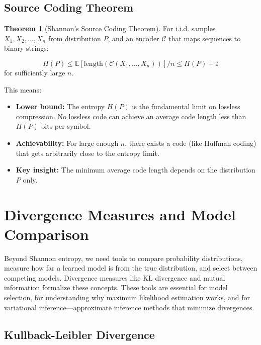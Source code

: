 \documentclass[12pt,a4paper]{article}
\theoremstyle{definition}
\newtheorem{theorem}{Theorem}[section]
\begin{document}
\subsection{Source Coding Theorem}

\begin{theorem}[Shannon's Source Coding Theorem]
For i.i.d. samples $X_1, X_2, \ldots, X_n$ from distribution $P$, and an encoder $\mathcal{C}$ that maps sequences to binary strings:

\[
H(P) \leq \mathbb{E}[\text{length}(\mathcal{C}(X_1, \ldots, X_n))] / n \leq H(P) + \varepsilon
\]
for sufficiently large $n$.

This means:
\begin{itemize}
    \item \textbf{Lower bound:} The entropy $H(P)$ is the fundamental limit on lossless compression. No lossless code can achieve an average code length less than $H(P)$ bits per symbol.
    
    \item \textbf{Achievability:} For large enough $n$, there exists a code (like Huffman coding) that gets arbitrarily close to the entropy limit.
    
    \item \textbf{Key insight:} The minimum average code length depends on the distribution $P$ only.
\end{itemize}
\end{theorem}

\section{Divergence Measures and Model Comparison}

Beyond Shannon entropy, we need tools to compare probability distributions, measure how far a learned model is from the true distribution, and select between competing models. Divergence measures like KL divergence and mutual information formalize these concepts. These tools are essential for model selection, for understanding why maximum likelihood estimation works, and for variational inference—approximate inference methods that minimize divergences.

\subsection{Kullback-Leibler Divergence}
\end{document}
